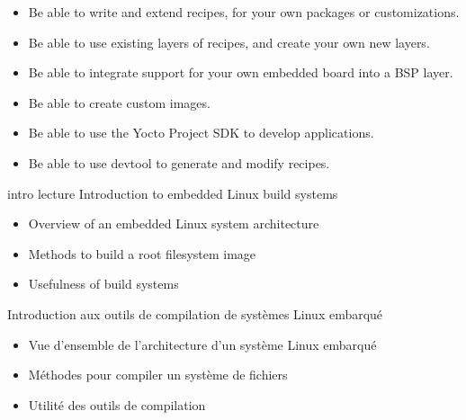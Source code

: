 {{\begin{itemize}
      with Yocto, and install the result on an embedded platform.
    \item Be able to write and extend recipes, for your own packages or
      customizations.
    \item Be able to use existing layers of recipes, and create your own
      new layers.
    \item Be able to integrate support for your own embedded board into
      a BSP layer.
    \item Be able to create custom images.
    \item Be able to use the Yocto Project SDK to develop applications.
    \item Be able to use devtool to generate and modify recipes.
    \end{itemize}
  }
}

\def \agendaboards{stm32mp1,beagleboneblack,beagleplay}

\def \trainingprerequisites{
  \begin{itemize}
    \prerequisitecommandline
    \prerequisiteembeddedlinux
    \prerequisiteenglish
  \end{itemize}
}


\def \trainers {alexandre-belloni,antonin-godard,jeremie-dautheribes,joaomarcos-costa,kamel-bouhara,luca-ceresoli}

\def \onsitelecturetimeratio{40}
\def \onsitelabtimeratio{60}


{intro}
{lecture}
{Introduction to embedded Linux build systems}
{
  \begin{itemize}
  \item Overview of an embedded Linux system architecture
  \item Methods to build a root filesystem image
  \item Usefulness of build systems
  \end{itemize}
}
{Introduction aux outils de compilation de systèmes Linux embarqué}
{
  \begin{itemize}
  \item Vue d'ensemble de l'architecture d'un système Linux embarqué
  \item Méthodes pour compiler un système de fichiers
  \item Utilité des outils de compilation
  \end{itemize}
}

